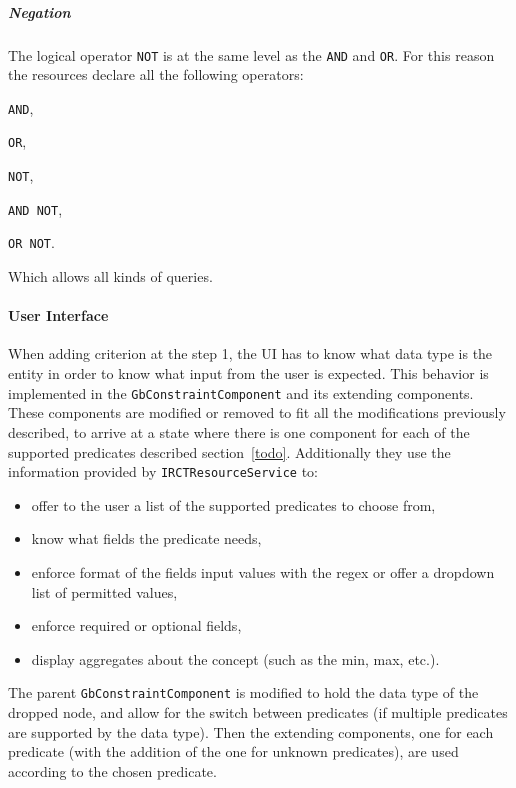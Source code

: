 \subparagraph{Negation}
The logical operator \verb|NOT| is at the same level as the \verb|AND| and \verb|OR|.
For this reason the resources declare all the following operators:
\begin{enumerate*}[label=(\arabic*)]
  \item \verb|AND|,
  \item \verb|OR|,
  \item \verb|NOT|,
  \item \verb|AND NOT|,
  \item \verb|OR NOT|.
\end{enumerate*}
Which allows all kinds of queries.


\paragraph{User Interface}
When adding criterion at the step 1, the UI has to know what data type is the entity in order to know what input from the user is expected.
This behavior is implemented in the \verb|GbConstraintComponent| and its extending components.
These components are modified or removed to fit all the modifications previously described, to arrive at a state where there is one component for each of the supported predicates described section~\ref{todo}.
Additionally they use the information provided by \verb|IRCTResourceService| to:
\begin{itemize}
    \item offer to the user a list of the supported predicates to choose from,
    \item know what fields the predicate needs,
    \item enforce format of the fields input values with the regex or offer a dropdown list of permitted values, 
    \item enforce required or optional fields,
    \item display aggregates about the concept (such as the min, max, etc.).
\end{itemize}

The parent \verb|GbConstraintComponent| is modified to hold the data type of the dropped node, and allow for the switch between predicates (if multiple predicates are supported by the data type).
Then the extending components, one for each predicate (with the addition of the one for unknown predicates), are used according to the chosen predicate.



